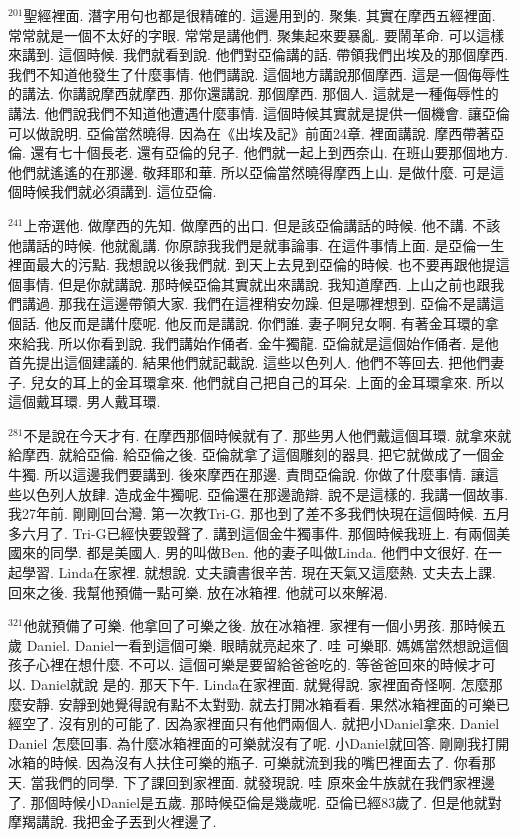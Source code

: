 \documentclass{book}
\begin{document}
$^{201}$聖經裡面.
潛字用句也都是很精確的.
這邊用到的.
聚集.
其實在摩西五經裡面.
常常就是一個不太好的字眼.
常常是講他們.
聚集起來要暴亂.
要鬧革命.
可以這樣來講到.
這個時候.
我們就看到說.
他們對亞倫講的話.
帶領我們出埃及的那個摩西.
我們不知道他發生了什麼事情.
他們講說.
這個地方講說那個摩西.
這是一個侮辱性的講法.
你講說摩西就摩西.
那你還講說.
那個摩西.
那個人.
這就是一種侮辱性的講法.
他們說我們不知道他遭遇什麼事情.
這個時候其實就是提供一個機會.
讓亞倫可以做說明.
亞倫當然曉得.
因為在《出埃及記》前面24章.
裡面講說.
摩西帶著亞倫.
還有七十個長老.
還有亞倫的兒子.
他們就一起上到西奈山.
在班山要那個地方.
他們就遙遙的在那邊.
敬拜耶和華.
所以亞倫當然曉得摩西上山.
是做什麼.
可是這個時候我們就必須講到.
這位亞倫.

$^{241}$上帝選他.
做摩西的先知.
做摩西的出口.
但是該亞倫講話的時候.
他不講.
不該他講話的時候.
他就亂講.
你原諒我我們是就事論事.
在這件事情上面.
是亞倫一生裡面最大的污點.
我想說以後我們就.
到天上去見到亞倫的時候.
也不要再跟他提這個事情.
但是你就講說.
那時候亞倫其實就出來講說.
我知道摩西.
上山之前也跟我們講過.
那我在這邊帶領大家.
我們在這裡稍安勿躁.
但是哪裡想到.
亞倫不是講這個話.
他反而是講什麼呢.
他反而是講說.
你們誰.
妻子啊兒女啊.
有著金耳環的拿來給我.
所以你看到說.
我們講始作俑者.
金牛獨龍.
亞倫就是這個始作俑者.
是他首先提出這個建議的.
結果他們就記載說.
這些以色列人.
他們不等回去.
把他們妻子.
兒女的耳上的金耳環拿來.
他們就自己把自己的耳朵.
上面的金耳環拿來.
所以這個戴耳環.
男人戴耳環.

$^{281}$不是說在今天才有.
在摩西那個時候就有了.
那些男人他們戴這個耳環.
就拿來就給摩西.
就給亞倫.
給亞倫之後.
亞倫就拿了這個雕刻的器具.
把它就做成了一個金牛獨.
所以這邊我們要講到.
後來摩西在那邊.
責問亞倫說.
你做了什麼事情.
讓這些以色列人放肆.
造成金牛獨呢.
亞倫還在那邊詭辯.
說不是這樣的.
我講一個故事.
我27年前.
剛剛回台灣.
第一次教Tri-G.
那也到了差不多我們快現在這個時候.
五月多六月了.
Tri-G已經快要毀聲了.
講到這個金牛獨事件.
那個時候我班上.
有兩個美國來的同學.
都是美國人.
男的叫做Ben.
他的妻子叫做Linda.
他們中文很好.
在一起學習.
Linda在家裡.
就想說.
丈夫讀書很辛苦.
現在天氣又這麼熱.
丈夫去上課.
回來之後.
我幫他預備一點可樂.
放在冰箱裡.
他就可以來解渴.

$^{321}$他就預備了可樂.
他拿回了可樂之後.
放在冰箱裡.
家裡有一個小男孩.
那時候五歲 Daniel.
Daniel一看到這個可樂.
眼睛就亮起來了.
哇 可樂耶.
媽媽當然想說這個孩子心裡在想什麼.
不可以.
這個可樂是要留給爸爸吃的.
等爸爸回來的時候才可以.
Daniel就說 是的.
那天下午.
Linda在家裡面.
就覺得說.
家裡面奇怪啊.
怎麼那麼安靜.
安靜到她覺得說有點不太對勁.
就去打開冰箱看看.
果然冰箱裡面的可樂已經空了.
沒有別的可能了.
因為家裡面只有他們兩個人.
就把小Daniel拿來.
Daniel Daniel 怎麼回事.
為什麼冰箱裡面的可樂就沒有了呢.
小Daniel就回答.
剛剛我打開冰箱的時候.
因為沒有人扶住可樂的瓶子.
可樂就流到我的嘴巴裡面去了.
你看那天.
當我們的同學.
下了課回到家裡面.
就發現說.
哇 原來金牛族就在我們家裡邊了.
那個時候小Daniel是五歲.
那時候亞倫是幾歲呢.
亞倫已經83歲了.
但是他就對摩羯講說.
我把金子丟到火裡邊了.
\end{document}
